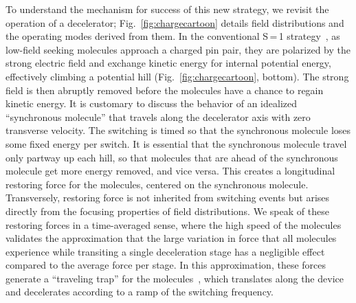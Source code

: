\documentclass[%
 reprint,
 amsmath,amssymb,
 aps,
prl,
]{revtex4-1}
\begin{document}
To understand the mechanism for success of this new strategy, we revisit the operation of a decelerator; Fig.~\ref{fig:chargecartoon} details field distributions and the operating modes derived from them.
In the conventional S\,=\,1 strategy~\cite{VanDeMeerakker2012}, as low-field seeking molecules approach a charged pin pair, they are polarized by the strong electric field and exchange kinetic energy for internal potential energy, effectively climbing a potential hill (Fig.~\ref{fig:chargecartoon}, bottom).
The strong field is then abruptly removed before the molecules have a chance to regain kinetic energy. It is customary to discuss the behavior of an idealized ``synchronous molecule'' that travels along the decelerator axis with zero transverse velocity.
The switching is timed so that the synchronous molecule loses some fixed energy per switch.
It is essential that the synchronous molecule travel only partway up each hill, so that molecules that are ahead of the synchronous molecule get more energy removed, and vice versa.
This creates a longitudinal restoring force for the molecules, centered on the synchronous molecule.
Transversely, restoring force is not inherited from switching events but arises directly from the focusing properties of field distributions.
We speak of these restoring forces in a time-averaged sense, where the high speed of the molecules validates the approximation that the large variation in force that all molecules experience while transiting a single deceleration stage has a negligible effect compared to the average force per stage.
In this approximation, these forces generate a ``traveling trap'' for the molecules~\cite{Bethlem2000}, which translates along the device and decelerates according to a ramp of the switching frequency.
\end{document}
